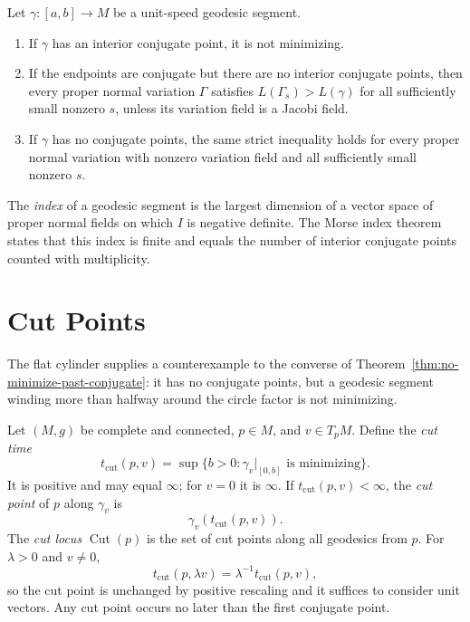 \begin{corollary}
\label{cor:conjugate-point-not-minimizing}
Let $\gamma\colon[a,b]\to M$ be a unit-speed geodesic segment.
\begin{enumerate}
\item[(a)] If $\gamma$ has an interior conjugate point, it is not minimizing.
\item[(b)] If the endpoints are conjugate but there are no interior conjugate
points, then every proper normal variation $\Gamma$ satisfies
$L(\Gamma_s)>L(\gamma)$ for all sufficiently small nonzero $s$, unless its
variation field is a Jacobi field.
\item[(c)] If $\gamma$ has no conjugate points, the same strict inequality
holds for every proper normal variation with nonzero variation field and all
sufficiently small nonzero $s$.
\end{enumerate}
\end{corollary}

The \emph{index} of a geodesic segment is the largest dimension of a vector
space of proper normal fields on which $I$ is negative definite. The Morse
index theorem states that this index is finite and equals the number of
interior conjugate points counted with multiplicity.

\section{Cut Points}

The flat cylinder supplies a counterexample to the converse of
Theorem~\ref{thm:no-minimize-past-conjugate}: it has no conjugate points, but a
geodesic segment winding more than halfway around the circle factor is not
minimizing.

Let $(M,g)$ be complete and connected, $p\in M$, and $v\in T_pM$. Define the
\emph{cut time}
\[
t_{\mathrm{cut}}(p,v)
=\sup\{b>0:\gamma_v|_{[0,b]}\text{ is minimizing}\}.
\]
It is positive and may equal $\infty$; for $v=0$ it is $\infty$. If
$t_{\mathrm{cut}}(p,v)<\infty$, the \emph{cut point} of $p$ along $\gamma_v$
is
\[
\gamma_v(t_{\mathrm{cut}}(p,v)).
\]
The \emph{cut locus} $\operatorname{Cut}(p)$ is the set of cut points along all
geodesics from $p$. For $\lambda>0$ and $v\ne0$,
\[
t_{\mathrm{cut}}(p,\lambda v)=\lambda^{-1}t_{\mathrm{cut}}(p,v),
\]
so the cut point is unchanged by positive rescaling and it suffices to consider
unit vectors. Any cut point occurs no later than the first conjugate point.

